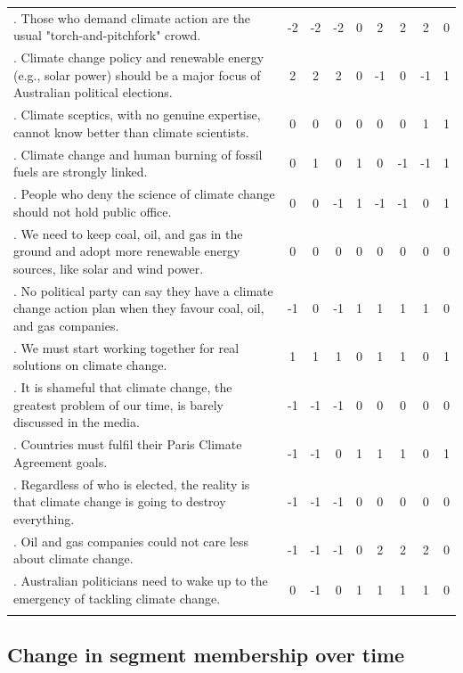 \documentclass[
  letterpaper,
  DIV=11,
  numbers=noendperiod]{scrartcl}
\begin{document}
\begin{longtable}[t]{>{\raggedright\arraybackslash}p{12em}cccccccc}
18. Those who demand climate action are the usual "torch-and-pitchfork" crowd. & -2 & -2 & -2 & 0 & 2 & 2 & 2 & 0\\
19. Climate change policy and renewable energy (e.g., solar power) should be a major focus of Australian political elections. & 2 & 2 & 2 & 0 & -1 & 0 & -1 & 1\\
20. Climate sceptics, with no genuine expertise, cannot know better than climate scientists. & 0 & 0 & 0 & 0 & 0 & 0 & 1 & 1\\
21. Climate change and human burning of fossil fuels are strongly linked. & 0 & 1 & 0 & 1 & 0 & -1 & -1 & 1\\
22. People who deny the science of climate change should not hold public office. & 0 & 0 & -1 & 1 & -1 & -1 & 0 & 1\\
23. We need to keep coal, oil, and gas in the ground and adopt more renewable energy sources, like solar and wind power. & 0 & 0 & 0 & 0 & 0 & 0 & 0 & 0\\
24. No political party can say they have a climate change action plan when they favour coal, oil, and gas companies. & -1 & 0 & -1 & 1 & 1 & 1 & 1 & 0\\
25. We must start working together for real solutions on climate change. & 1 & 1 & 1 & 0 & 1 & 1 & 0 & 1\\
26. It is shameful that climate change, the greatest problem of our time, is barely discussed in the media. & -1 & -1 & -1 & 0 & 0 & 0 & 0 & 0\\
27. Countries must fulfil their Paris Climate Agreement goals. & -1 & -1 & 0 & 1 & 1 & 1 & 0 & 1\\
28. Regardless of who is elected, the reality is that climate change is going to destroy everything. & -1 & -1 & -1 & 0 & 0 & 0 & 0 & 0\\
29. Oil and gas companies could not care less about climate change. & -1 & -1 & -1 & 0 & 2 & 2 & 2 & 0\\
30. Australian politicians need to wake up to the emergency of tackling climate change. & 0 & -1 & 0 & 1 & 1 & 1 & 1 & 0\\*

\end{longtable}

\clearpage

\subsection{Change in segment membership over
time}\label{change-in-segment-membership-over-time}
\end{document}
